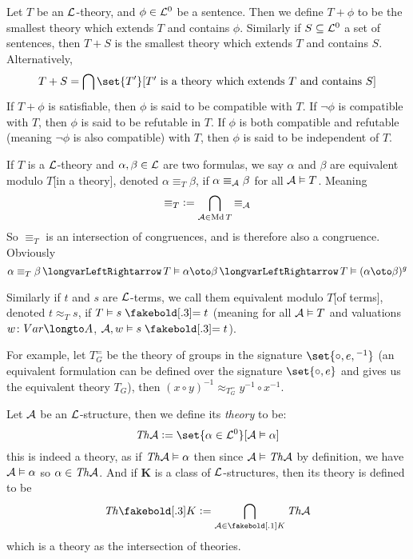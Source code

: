\bdefn

    Let $T$ be an ${\cal L}$-theory, and $\phi\in{\cal L}^0$ be a sentence.
    Then we define $T+\phi$ to be the smallest theory which extends $T$ and contains $\phi$.
    Similarly if $S\subseteq{\cal L}^0$ a set of sentences, then $T+S$ is the smallest theory which extends $T$ and contains $S$.
    Alternatively,
    $$ T + S = \bigcap\set{T'}[\hbox{$T'$ is a theory which extends $T$ and contains $S$}] $$
    If $T+\phi$ is satisfiable, then $\phi$ is said to be {\emphcolor compatible with $T$}.
    If $\neg\phi$ is compatible with $T$, then $\phi$ is said to be {\emphcolor refutable in $T$}.
    If $\phi$ is both compatible and refutable (meaning $\neg\phi$ is also compatible) with $T$, then $\phi$ is said to be {\emphcolor independent of $T$}.

\edefn

\bdefn

    If $T$ is a ${\cal L}$-theory and $\alpha,\beta\in{\cal L}$ are two formulas, we say $\alpha$ and $\beta$ are {\emphcolor equivalent modulo $T$}[in a theory], denoted
    $\alpha\equiv_T\beta$, if $\alpha\equiv_{\cal A}\beta$ for all ${\cal A}\vDash T$.
    Meaning
    $$ {\equiv_T} \mathrel{{\mathop:}{=}} \bigcap_{{\cal A}\in\mathop{\rm Md} T}{\equiv_{\cal A}} $$
    So $\equiv_T$ is an intersection of congruences, and is therefore also a congruence.
    Obviously
    $$ \alpha\equiv_T\beta \iff T\vDash\alpha\oto\beta \iff T\vDash(\alpha\oto\beta)^g $$

    Similarly if $t$ and $s$ are ${\cal L}$-terms, we call them {\emphcolor equivalent modulo $T$}[of terms], denoted $t\approx_Ts$, if $T\vDash s\eq t$ (meaning for all
    ${\cal A}\vDash T$ and valuations $w\colon\Var\longto A$, ${\cal A},w\vDash s\eq t$).

\edefn

For example, let $T_G^=$ be the theory of groups in the signature $\set{\circ,e,{}^{-1}}$ (an equivalent formulation can be defined over the signature $\set{\circ,e}$ and gives us the equivalent theory
$T_G$), then $(x\circ y)^{-1}\approx_{T_G^=}y^{-1}\circ x^{-1}$.

Let ${\cal A}$ be an ${\cal L}$-structure, then we define its {\it theory} to be:
$$ \Th{\cal A} \coloneqq \set{\alpha\in{\cal L}^0}[{\cal A}\vDash\alpha] $$
this is indeed a theory, as if ${\it Th}{\cal A}\vDash\alpha$ then since ${\cal A}\vDash{\it Th}{\cal A}$ by definition, we have ${\cal A}\vDash\alpha$ so $\alpha\in{\it Th}{\cal A}$.
And if $\boldsymbol K$ is a class of ${\cal L}$-structures, then its theory is defined to be
$$ \Th\boldsymbol K \coloneqq \bigcap_{{\cal A}\in\boldsymbol K}\Th{\cal A} $$
which is a theory as the intersection of theories.

